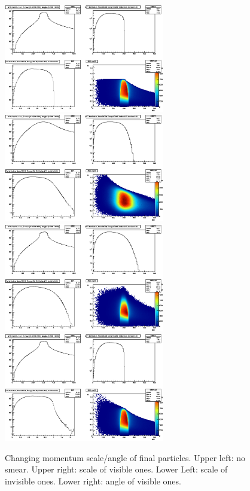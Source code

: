 \documentclass{fheadnote}
\begin{document}
\begin{figure}[htbp]
   \centering
   \includegraphics[width=7cm]{Figures/MRToy3_NoSmear}
   \includegraphics[width=7cm]{Figures/MRToy3_MomentumSmear}\\
   \includegraphics[width=7cm]{Figures/MRToy3_InvisibleMomentumSmear}
   \includegraphics[width=7cm]{Figures/MRToy3_AngleSmear}
   \caption{Changing momentum scale/angle of final particles.  Upper left: no smear.  Upper right: scale of visible ones.  Lower Left: scale of invisible ones.  Lower right: angle of visible ones.}
   \label{Figure_MRToy3}
\end{figure}
\end{document}
